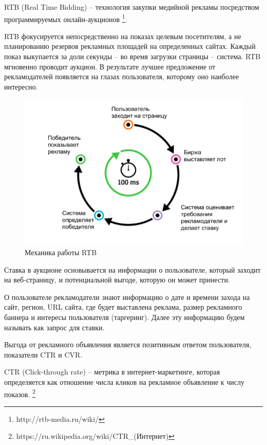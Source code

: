 \documentclass[times,specification,annotation]{itmo-student-thesis}
\begin{document}
\begin{definition}
    RTB (Real Time Bidding) – технология закупки медийной рекламы посредством программируемых онлайн-аукционов
    \footnote{\label{fn:rtb} http://rtb-media.ru/wiki/}.
\end{definition}

RTB фокусируется непосредственно на показах целевым посетителям,
а не планированию резервов рекламных площадей на определенных сайтах. 
Каждый показ выкупается за доли секунды – во время загрузки страницы – система. 
RTB мгновенно проводит аукцион. В результате лучшее предложение от рекламодателей появляется на глазах пользователя, которому оно наиболее интересно. 

\begin{figure}[h]
    \caption{Механика работы RTB}
    \centering
    \includegraphics{rtb-example.png}
\end{figure}

Ставка в аукционе основывается на информации о пользователе, 
который заходит на веб-страницу, 
и потенциальной выгоде, которую он может принести.

О пользователе рекламодатели знают информацию 
о дате и времени захода на сайт, регион, URL сайта, где будет выставлена реклама, 
размер рекламного баннера и интересы пользователя (таргеринг). 
Далее эту информацию будем называть как запрос для ставки.

Выгода от рекламного объявления является позитивным ответом пользователя, показатели CTR и CVR.

\begin{definition}
    CTR (Click-through rate) – метрика в интернет-маркетинге, 
    которая определяется как отношение числа кликов на рекламное объявление к числу показов.
    \footnote{https://ru.wikipedia.org/wiki/CTR_(Интернет)}
\end{definition}
\end{document}

